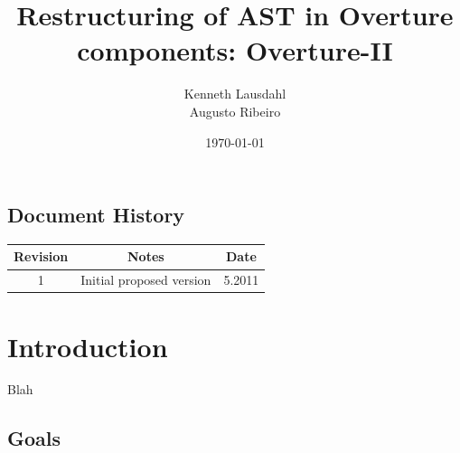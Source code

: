 \documentclass{overturerep}
\begin{document}
 
\title{Restructuring of AST in Overture components: Overture-II}
\author{Kenneth Lausdahl\\
        Augusto Ribeiro}

\date{\today}

{}     

\maketitle
\tableofcontents
\newpage


\section*{Document History}
\begin{center}
\begin{tabular}{|c|c|c|}
\hline
\textbf{Revision} & \textbf{Notes} & \textbf{Date} \\ \hline
1 & Initial proposed version& 5.2011 \\ \hline
\end{tabular}
\end{center}


\setcounter{page}{1}

\chapter{Introduction}
Blah

\section{Goals}
\end{document}
